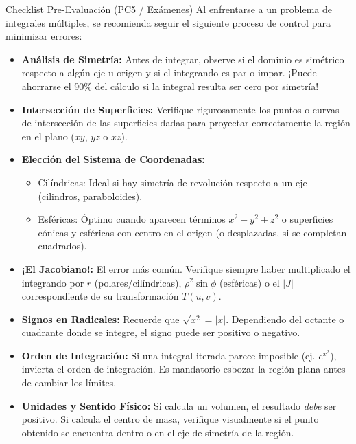 \documentclass[11pt,a4paper]{article}
\begin{document}
\begin{teoremabox}{Checklist Pre-Evaluación (PC5 / Exámenes)}
Al enfrentarse a un problema de integrales múltiples, se recomienda seguir el siguiente proceso de control para minimizar errores:

\begin{itemize}
    \item[\checkmark] \textbf{Análisis de Simetría:} Antes de integrar, observe si el dominio es simétrico respecto a algún eje u origen y si el integrando es par o impar. ¡Puede ahorrarse el 90\% del cálculo si la integral resulta ser cero por simetría!
    \item[\checkmark] \textbf{Intersección de Superficies:} Verifique rigurosamente los puntos o curvas de intersección de las superficies dadas para proyectar correctamente la región en el plano ($xy$, $yz$ o $xz$).
    \item[\checkmark] \textbf{Elección del Sistema de Coordenadas:}
    \begin{itemize}
        \item Cilíndricas: Ideal si hay simetría de revolución respecto a un eje (cilindros, paraboloides).
        \item Esféricas: Óptimo cuando aparecen términos $x^2+y^2+z^2$ o superficies cónicas y esféricas con centro en el origen (o desplazadas, si se completan cuadrados).
    \end{itemize}
    \item[\checkmark] \textbf{¡El Jacobiano!:} El error más común. Verifique siempre haber multiplicado el integrando por $r$ (polares/cilíndricas), $\rho^2\sin\phi$ (esféricas) o el $|J|$ correspondiente de su transformación $T(u,v)$.
    \item[\checkmark] \textbf{Signos en Radicales:} Recuerde que $\sqrt{x^2} = |x|$. Dependiendo del octante o cuadrante donde se integre, el signo puede ser positivo o negativo.
    \item[\checkmark] \textbf{Orden de Integración:} Si una integral iterada parece imposible (ej. $e^{x^2}$), invierta el orden de integración. Es mandatorio esbozar la región plana antes de cambiar los límites.
    \item[\checkmark] \textbf{Unidades y Sentido Físico:} Si calcula un volumen, el resultado \textit{debe} ser positivo. Si calcula el centro de masa, verifique visualmente si el punto obtenido se encuentra dentro o en el eje de simetría de la región.
\end{itemize}
\end{teoremabox}
\end{document}
